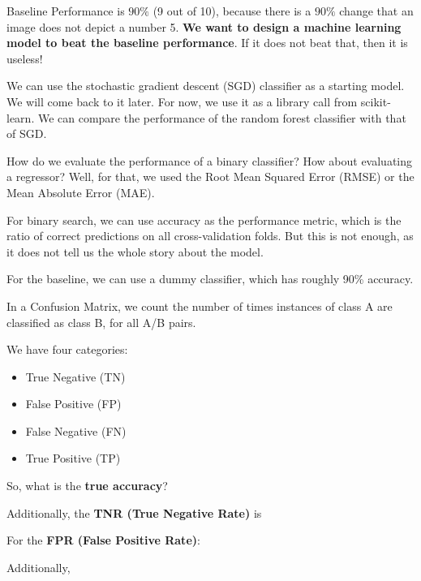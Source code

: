 {Baseline Performance is $90\%$ (9 out of 10), because there is a $90\%$ change that an image does not depict a number 5. \textbf{We want to design a machine learning model to beat the baseline performance}. If it does not beat that, then it is useless!

We can use the stochastic gradient descent (SGD) classifier as a starting model. We will come back to it later. For now, we use it as a library call from scikit-learn. We can compare the performance of the random forest classifier with that of SGD.


How do we evaluate the performance of a binary classifier? How about evaluating a regressor? Well, for that, we used the Root Mean Squared Error (RMSE) or the Mean Absolute Error (MAE).

For binary search, we can use accuracy as the performance metric, which is the ratio of correct predictions on all cross-validation folds. But this is not enough, as it does not tell us the whole story about the model.

For the baseline, we can use a dummy classifier, which has roughly 90\% accuracy.


In a Confusion Matrix, we count the number of times instances of class A are classified as class B, for all A/B pairs.


\vs
We have four categories:
\begin{itemize}
    \item True Negative (TN)
    \item False Positive (FP)
    \item False Negative (FN)
    \item True Positive (TP)
\end{itemize}


So, what is the \textbf{true accuracy}?


Additionally, the \textbf{TNR (True Negative Rate)} is


For the \textbf{FPR (False Positive Rate)}:


Additionally,

}
